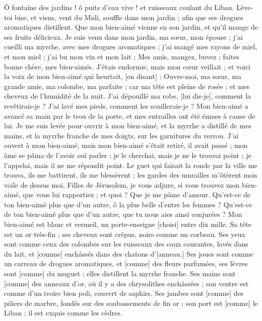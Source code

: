\begin{multicols}{2}
Ô fontaine des jardins ! ô puits d'eau vive ! et ruisseaux coulant du Liban.
Lève-toi bise, et viens, vent du Midi, souffle dans mon jardin ; afin que ses drogues aromatiques distillent. Que mon bien-aimé vienne en son jardin, et qu'il mange de ses fruits délicieux.
\VerseOne{}Je suis venu dans mon jardin, ma sœur, mon épouse ; j'ai cueilli ma myrrhe, avec mes drogues aromatiques ; j'ai mangé mes rayons de miel, et mon miel ; j'ai bu mon vin et mon lait ; Mes amis, mangez, buvez ; faites bonne chère, mes bien-aimés.
J'étais endormie, mais mon cœur veillait ; et voici la voix de mon bien-aimé qui heurtait, [en disant] : Ouvre-moi, ma sœur, ma grande amie, ma colombe, ma parfaite ; car ma tête est pleine de rosée ; et mes cheveux de l'humidité de la nuit.
J'ai dépouillé ma robe, [lui dis-je], comment la revêtirais-je ? J'ai lavé mes pieds, comment les souillerais-je ?
Mon bien-aimé a avancé sa main par le trou de la porte, et mes entrailles ont été émues à cause de lui.
Je me suis levée pour ouvrir à mon bien-aimé, et la myrrhe a distillé de mes mains, et la myrrhe franche de mes doigts, sur les garnitures du verrou.
J'ai ouvert à mon bien-aimé, mais mon bien-aimé s'était retiré, il avait passé ; mon âme se pâma de l'avoir ouï parler ; je le cherchai, mais je ne le trouvai point ; je l'appelai, mais il ne me répondit point.
Le guet qui faisait la ronde par la ville me trouva, ils me battirent, ils me blessèrent ; les gardes des murailles m'ôtèrent mon voile de dessus moi.
Filles de Jérusalem, je vous adjure, si vous trouvez mon bien-aimé, que vous lui rapportiez ; et quoi ? Que je me pâme d'amour.
Qu'est-ce de ton bien-aimé plus que d'un autre, ô la plus belle d'entre les femmes ? Qu'est-ce de ton bien-aimé plus que d'un autre, que tu nous aies ainsi conjurées ?
Mon bien-aimé est blanc et vermeil, un porte-enseigne [choisi] entre dix mille.
Sa tête est un or très-fin ; ses cheveux sont crépus, noirs comme un corbeau.
Ses yeux sont comme ceux des colombes sur les ruisseaux des eaux courantes, lavés dans du lait, et [comme] enchâssés dans des chatons d'[anneau.]
Ses joues sont comme un carreau de drogues aromatiques, et [comme] des fleurs parfumées, ses lèvres sont [comme] du muguet ; elles distillent la myrrhe franche.
Ses mains sont [comme] des anneaux d'or, où il y a des chrysolithes enchâssées ; son ventre est comme d'un ivoire bien poli, couvert de saphirs.
Ses jambes sont [comme] des piliers de marbre, fondés sur des soubassements de fin or ; son port est [comme] le Liban ; il est exquis comme les cèdres.

\end{multicols}
